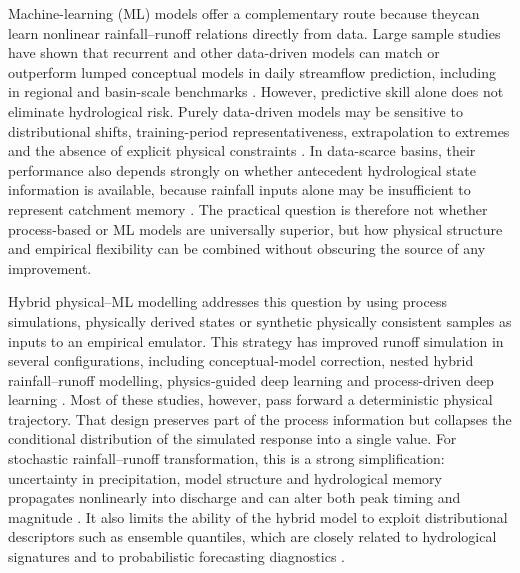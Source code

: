 \documentclass[a4paper,fleqn]{cas-sc}
\begin{document}
Machine-learning (ML) models offer a complementary route because theycan learn nonlinear rainfall--runoff relations directly from data. Large sample studies have shown that recurrent and other data-driven models can match or outperform lumped conceptual models in daily streamflow prediction, including in regional and basin-scale benchmarks
\citep{kratzert2019towards,lees2021benchmarking,arsenault2022continuous}.
However, predictive skill alone does not eliminate hydrological risk.
Purely data-driven models may be sensitive to distributional shifts,
training-period representativeness, extrapolation to extremes and the
absence of explicit physical constraints
\citep{frame2021deep,zhong2023developing}. In data-scarce basins, their
performance also depends strongly on whether antecedent hydrological
state information is available, because rainfall inputs alone may be
insufficient to represent catchment memory
\citep{adnan2021comparison,okkan2021embedding}. The practical question
is therefore not whether process-based or ML models are universally
superior, but how physical structure and empirical flexibility can be
combined without obscuring the source of any improvement.

Hybrid physical--ML modelling addresses this question by using process
simulations, physically derived states or synthetic physically
consistent samples as inputs to an empirical emulator. This strategy has
improved runoff simulation in several configurations, including
conceptual-model correction, nested hybrid rainfall--runoff modelling,
physics-guided deep learning and process-driven deep learning
\citep{mekonnen2015hybrid,mohammadi2022ihacres,okkan2021embedding,yang2020physical,xie2021physics,li2024process,zhu2025hybrid}.
Most of these studies, however, pass forward a deterministic physical
trajectory. That design preserves part of the process information but
collapses the conditional distribution of the simulated response into a
single value. For stochastic rainfall--runoff transformation, this is a
strong simplification: uncertainty in precipitation, model structure and
hydrological memory propagates nonlinearly into discharge and can alter
both peak timing and magnitude
\citep{gabellani2007propagation,hong2006uncertainty}. It also limits the
ability of the hybrid model to exploit distributional descriptors such
as ensemble quantiles, which are closely related to hydrological
signatures and to probabilistic forecasting diagnostics
\citep{guo2021regionalization,papacharalampous2022review}.
\end{document}

